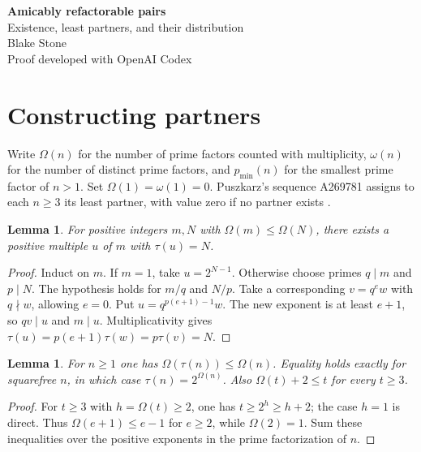 \documentclass[11pt]{article}
\newtheorem{lemma}[theorem]{Lemma}
\newcommand{\least}{p_{\min}}
\begin{document}
\begin{center}
{\LARGE\bfseries Amicably refactorable pairs}\\[6pt]
{\large Existence, least partners, and their distribution}\\[7pt]
Blake Stone\\[-1pt]{\small Proof developed with OpenAI Codex}
\end{center}
\begin{abstract}
Let $\tau(n)$ be the number of positive divisors of $n$. In 2016 Puszkarz conjectured that every integer $n\ge3$ has a distinct partner $k$ satisfying $\tau(n)\mid k$ and $\tau(k)\mid n$. We prove this conjecture. Every composite $n$ has infinitely many partners with $\tau(k)=n$, and every odd prime $p$ has precisely one partner, $2^{p-1}$. We give a finite formula for the least partner and an asymptotic count of all partners of each fixed composite. The associated graph on the integers at least three is connected, with diameter between five and eight.
\end{abstract}

\section{Constructing partners}
Write $\Omega(n)$ for the number of prime factors counted with multiplicity, $\omega(n)$ for the number of distinct prime factors, and $\least(n)$ for the smallest prime factor of $n>1$. Set $\Omega(1)=\omega(1)=0$. Puszkarz's sequence A269781 assigns to each $n\ge3$ its least partner, with value zero if no partner exists \cite{oeis}.

\begin{lemma}\label{lift}
For positive integers $m,N$ with $\Omega(m)\le\Omega(N)$, there exists a positive multiple $u$ of $m$ with $\tau(u)=N$.
\end{lemma}
\begin{proof}
Induct on $m$. If $m=1$, take $u=2^{N-1}$. Otherwise choose primes $q\mid m$ and $p\mid N$. The hypothesis holds for $m/q$ and $N/p$. Take a corresponding $v=q^e w$ with $q\nmid w$, allowing $e=0$. Put $u=q^{p(e+1)-1}w$. The new exponent is at least $e+1$, so $qv\mid u$ and $m\mid u$. Multiplicativity gives $\tau(u)=p(e+1)\tau(w)=p\tau(v)=N$.
\end{proof}

\begin{lemma}\label{budget}
For $n\ge1$ one has $\Omega(\tau(n))\le\Omega(n)$. Equality holds exactly for squarefree $n$, in which case $\tau(n)=2^{\Omega(n)}$. Also $\Omega(t)+2\le t$ for every $t\ge3$.
\end{lemma}
\begin{proof}
For $t\ge3$ with $h=\Omega(t)\ge2$, one has $t\ge2^h\ge h+2$; the case $h=1$ is direct. Thus $\Omega(e+1)\le e-1$ for $e\ge2$, while $\Omega(2)=1$. Sum these inequalities over the positive exponents in the prime factorization of $n$.
\end{proof}
\end{document}
